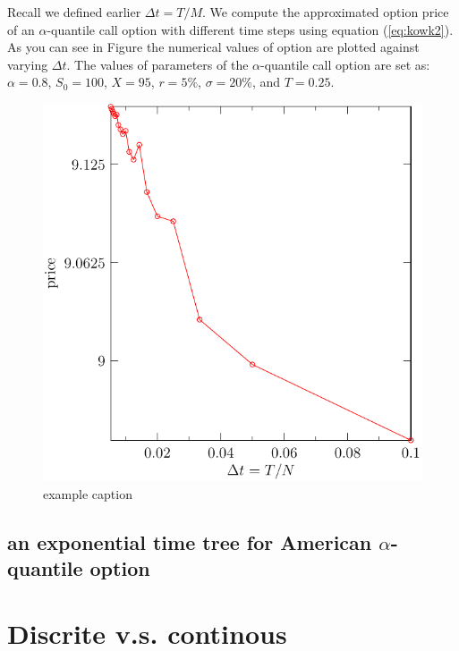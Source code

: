 \documentclass[11pt]{book}
\begin{document}
Recall we defined earlier $\Delta t = T / M$. We compute the approximated option price of an $\alpha$-quantile call option with different time steps using equation (\ref{eq:kowk2}). As you can see in Figure %
the numerical values of option are plotted against varying $\Delta t$. The values of parameters of the $\alpha$-quantile call option are set as: $ \alpha = 0.8$, $S_0 = 100$, $X = 95$, $r = 5\%$, $\sigma = 20\%$, and $T = 0.25$. 
\begin{figure}[htbp]
   \centering
   \includegraphics{bfsg.pdf} %
   \caption{example caption}
   \label{fig:2}
\end{figure}


\subsection{ an exponential time tree for American $\alpha$-quantile option}
 
 











\section{Discrite v.s. continous}
\end{document}
